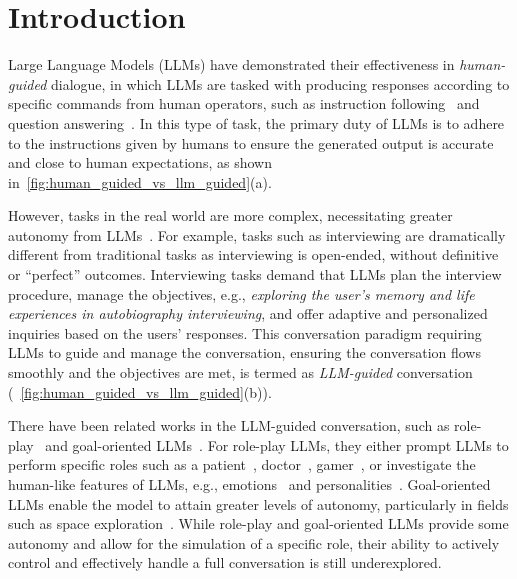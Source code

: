 
\section{Introduction}
Large Language Models (LLMs) have demonstrated their effectiveness in \textit{human-guided} dialogue, in which LLMs are tasked with producing responses according to specific commands from human operators, such as instruction following~\cite{ouyang2022training} and question answering~\cite{chang2024survey}. In this type of task, the primary duty of  LLMs is to adhere to the instructions given by humans to ensure the generated output is accurate and close to human expectations, as shown in~\cref{fig:human_guided_vs_llm_guided}(a).

However, tasks in the real world are more complex, necessitating greater autonomy from LLMs~\cite{wang2024survey,duan2022survey,wu2023autogen}. For example, tasks such as interviewing are dramatically different from traditional tasks as interviewing is open-ended, without definitive or ``perfect'' outcomes. Interviewing tasks demand that LLMs plan the interview procedure, manage the objectives, e.g., \textit{exploring the user's memory and life experiences in autobiography interviewing}, and offer adaptive and personalized inquiries based on the users' responses. This conversation paradigm requiring LLMs to guide and manage the conversation, ensuring the conversation flows smoothly and the objectives are met, is termed as \textit{LLM-guided} conversation (~\cref{fig:human_guided_vs_llm_guided}(b)).

There have been related works in the LLM-guided conversation, such as role-play~\cite{wang2024incharacter,wang2023rolellm,chen2024roleinteract,tao2023rolecraft,li2023chatharuhi} and goal-oriented LLMs~\cite{ham-etal-2020-end,NEURIPS2020_e9462095,wu-etal-2020-tod,MehriDialoGLUE2020,Inagaki2023LLMsCG}. For role-play LLMs, they either prompt LLMs to perform specific roles such as a patient~\cite{wang2024patient}, doctor~\cite{panagoulias2024augmenting}, gamer~\cite{duan-etal-2024-reta, duan2024gtbench}, or investigate the human-like features of LLMs, e.g., emotions~\cite{li2023large} and personalities~\cite{safdari2023personality}. 
Goal-oriented LLMs enable the model to attain greater levels of autonomy, particularly in fields such as space exploration~\cite{maranto2024llmsat}.
While role-play and goal-oriented LLMs provide some autonomy and allow for the simulation of a specific role, their ability to actively control and effectively handle a full conversation is still underexplored. 


